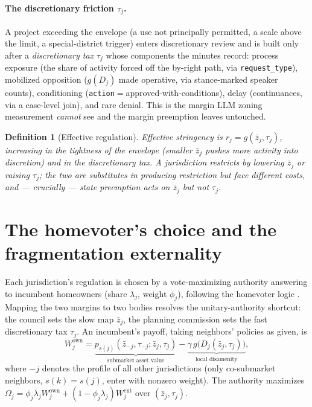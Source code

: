 \documentclass[11pt]{article}
\newtheorem{definition}{Definition}
\begin{document}
\paragraph{The discretionary friction $\tau_j$.} A project exceeding the envelope (a use not
principally permitted, a scale above the limit, a special-district trigger) enters discretionary
review and is built only after a \emph{discretionary tax} $\tau_j$ whose components the minutes
record: process exposure (the share of activity forced off the by-right path, via
\texttt{request\_type}), mobilized opposition ($g(D_j)$ made operative, via stance-marked speaker
counts), conditioning (\texttt{action}$=$approved-with-conditions), delay (continuances, via a
case-level join), and rare denial. This is the margin LLM zoning measurement \emph{cannot} see
and the margin preemption leaves untouched.

\begin{definition}[Effective regulation]
Effective stringency is $r_j=g(\bar z_j,\tau_j)$, increasing in the tightness of the envelope
(smaller $\bar z_j$ pushes more activity into discretion) and in the discretionary tax. A
jurisdiction restricts by lowering $\bar z_j$ \emph{or} raising $\tau_j$; the two are
substitutes in producing restriction but face different costs, and --- crucially --- state
preemption acts on $\bar z_j$ but not $\tau_j$.
\end{definition}

\section{The homevoter's choice and the fragmentation externality}\label{sec:pol}

Each jurisdiction's regulation is chosen by a vote-maximizing authority answering to incumbent
homeowners (share $\lambda_j$, weight $\phi_j$), following the homevoter logic
\citep{fischel2004economic}. Mapping the two margins to two bodies resolves the unitary-authority
shortcut: the council sets the slow map $\bar z_j$, the planning commission sets the fast
discretionary tax $\tau_j$. An incumbent's payoff, taking neighbors' policies as given, is
\begin{equation}
W^{\text{own}}_j = \underbrace{p_{s(j)}(\bar z_{-j},\tau_{-j};\bar z_j,\tau_j)}_{\text{submarket asset value}}
 - \underbrace{\gamma\,g\!\big(D_j(\bar z_j,\tau_j)\big)}_{\text{local disamenity}},
\label{eq:owner}
\end{equation}
where $-j$ denotes the profile of all other jurisdictions (only co-submarket neighbors,
$s(k)=s(j)$, enter with nonzero weight). The authority maximizes
$\Omega_j=\phi_j\lambda_j W^{\text{own}}_j+(1-\phi_j\lambda_j)W^{\text{ent}}_j$ over
$(\bar z_j,\tau_j)$.
\end{document}
